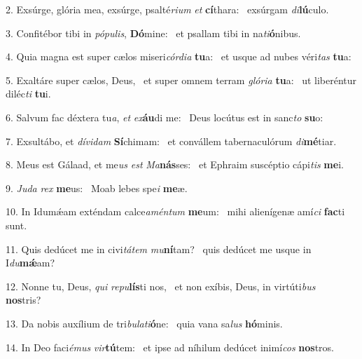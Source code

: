2. Exsúrge, glória mea, exsúrge, psalté\textit{ri}\textit{um} \textit{et} \textbf{cí}thara: \ast\  exsúrgam \textit{di}\textbf{lú}culo.\

3. Confitébor tibi in \textit{pó}\textit{pu}\textit{lis}, \textbf{Dó}mine: \ast\  et psallam tibi in na\textit{ti}\textbf{ó}nibus.\

4. Quia magna est super cælos miseri\textit{cór}\textit{di}\textit{a} \textbf{tu}a: \ast\  et usque ad nubes véri\textit{tas} \textbf{tu}a:\

5. Exaltáre super cælos, Deus, \dag\  et super omnem terram \textit{gló}\textit{ri}\textit{a} \textbf{tu}a: \ast\  ut liberéntur diléc\textit{ti} \textbf{tu}i.\

6. Salvum fac déxtera tu\textit{a}, \textit{et} \textit{ex}\textbf{áu}di me: \ast\  Deus locútus est in sanc\textit{to} \textbf{su}o:\

7. Exsultábo, et \textit{dí}\textit{vi}\textit{dam} \textbf{Sí}chimam: \ast\  et convállem tabernaculórum \textit{di}\textbf{mé}tiar.\

8. Meus est Gálaad, et me\textit{us} \textit{est} \textit{Ma}\textbf{nás}ses: \ast\  et Ephraim suscéptio cápi\textit{tis} \textbf{me}i.\

9. \textit{Ju}\textit{da} \textit{rex} \textbf{me}us: \ast\  Moab lebes spe\textit{i} \textbf{me}æ.\

10. In Idumǽam exténdam calce\textit{a}\textit{mén}\textit{tum} \textbf{me}um: \ast\  mihi alienígenæ amí\textit{ci} \textbf{fac}ti sunt.\

11. Quis dedúcet me in civi\textit{tá}\textit{tem} \textit{mu}\textbf{ní}tam? \ast\  quis dedúcet me usque in I\textit{du}\textbf{mǽ}am?\

12. Nonne tu, Deus, \textit{qui} \textit{re}\textit{pu}\textbf{lís}ti nos, \ast\  et non exíbis, Deus, in virtúti\textit{bus} \textbf{nos}tris?\

13. Da nobis auxílium de tri\textit{bu}\textit{la}\textit{ti}\textbf{ó}ne: \ast\  quia vana sa\textit{lus} \textbf{hó}minis.\

14. In Deo faci\textit{é}\textit{mus} \textit{vir}\textbf{tú}tem: \ast\  et ipse ad níhilum dedúcet inimí\textit{cos} \textbf{nos}tros.\


